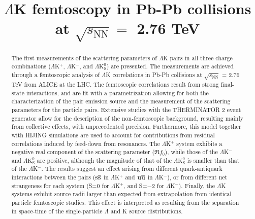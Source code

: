 \documentclass[ALICE,manyauthors]{cernphprep}
\newcommand{\LamK}{$\Lambda$K\xspace}
\begin{document}
%

\begin{titlepage}
%
%

\title{\LamK femtoscopy in Pb-Pb collisions at $\sqrt{s_{\mathrm{NN}}} = $ 2.76 TeV}
\ShortTitle{\LamK femtoscopy in Pb-Pb collisions}   %


\begin{abstract}
The first measurements of the scattering parameters of $\Lambda$K pairs in all three charge combinations ($\Lambda$K$^{+}$, $\Lambda$K$^{-}$, and $\Lambda\mathrm{K^{0}_{S}}$) are presented.
The measurements are achieved through a femtoscopic analysis of $\Lambda$K correlations in Pb-Pb collisions at $\sqrt{s_{\mathrm{NN}}}$ = 2.76 TeV from ALICE at the LHC.  
The femtoscopic correlations result from strong final-state interactions, and are fit with a parametrization allowing for both the characterization of the pair emission source and the measurement of the scattering parameters for the particle pairs.
Extensive studies with the THERMINATOR 2 event generator allow for the description of the non-femtoscopic background, resulting mainly from collective effects, with unprecedented precision.
Furthermore, this model together with HIJING simulations are used to account for contributions from residual correlations induced by feed-down from resonances.
The $\Lambda$K$^{+}$ system exhibits a negative real component of the scattering parameter ($\Re f_{0}$), while those of the $\Lambda$K$^{-}$ and $\Lambda\mathrm{K^{0}_{S}}$ are positive, although the magnitude of that of the $\Lambda\mathrm{K^{0}_{S}}$ is smaller than that of the $\Lambda$K$^{-}$.
The results suggest an effect arising from different quark-antiquark interactions between the pairs ($\rm s\overline{s}$ in $\Lambda$K$^{+}$ and $\rm u\overline{u}$ in $\Lambda$K$^{-}$), or from different net strangeness for each system (S=0 for $\Lambda$K$^{+}$, and S=$-2$ for $\Lambda$K$^{-}$).
Finally, the $\Lambda$K systems exhibit source radii larger than expected from extrapolation from identical particle femtoscopic studies.
This effect is interpreted as resulting from the separation in space-time of the single-particle $\Lambda$ and K source distributions.
\end{abstract}
\end{titlepage}
\setcounter{page}{2}
\end{document}

